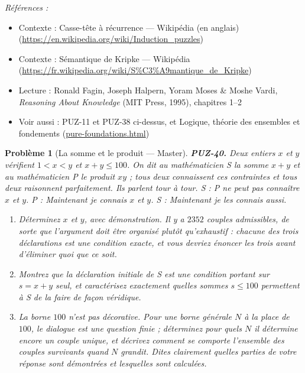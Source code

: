 \documentclass[11pt]{article}
\newtheorem{problem}{Problème}
\newenvironment{refs}{\par\small\noindent\emph{Références :}\begin{itemize}\setlength\itemsep{0pt}}{\end{itemize}\normalsize}
\begin{document}
\begin{refs}
\item Contexte : Casse-tête à récurrence --- Wikipédia (en anglais) (\url{https://en.wikipedia.org/wiki/Induction_puzzles})
\item Contexte : Sémantique de Kripke --- Wikipédia (\url{https://fr.wikipedia.org/wiki/S%C3%A9mantique_de_Kripke})
\item Lecture : Ronald Fagin, Joseph Halpern, Yoram Moses \& Moshe Vardi, \textit{Reasoning About Knowledge} (MIT Press, 1995), chapitres 1--2
\item Voir aussi : PUZ-11 et PUZ-38 ci-dessus, et Logique, théorie des ensembles et fondements (\url{pure-foundations.html})
\end{refs}

\bigskip

\begin{problem}[{La somme et le produit --- Master}]
\textbf{PUZ-40.} Deux entiers $ x $ et $ y $ vérifient $ 1 < x < y $ et
$ x + y \le 100 $. On dit au mathématicien S la somme $ x+y $ et au mathématicien P le
produit $ xy $ ; tous deux connaissent ces contraintes et tous deux raisonnent parfaitement.
Ils parlent tour à tour. S : \og{} P ne peut pas connaître $ x $ et $ y $. \fg{} P : \og{} Maintenant
je connais $ x $ et $ y $. \fg{} S : \og{} Maintenant je les connais aussi. \fg{}
\begin{enumerate}
\item[(a)] Déterminez $ x $ et $ y $, avec démonstration. Il y a $ 2352 $ couples
admissibles, de sorte que l'argument doit être organisé plutôt qu'exhaustif : chacune des
trois déclarations est une condition exacte, et vous devriez énoncer les trois avant
d'éliminer quoi que ce soit.
\item[(b)] Montrez que la déclaration initiale de S est une condition portant sur $ s = x+y $
seul, et caractérisez exactement quelles sommes $ s \le 100 $ permettent à S de la faire
de façon véridique.
\item[(c)] La borne $ 100 $ n'est pas décorative. Pour une borne générale $ N $ à la place de
$ 100 $, le dialogue est une question finie ; déterminez pour quels $ N $ il détermine
encore un couple unique, et décrivez comment se comporte l'ensemble des couples survivants
quand $ N $ grandit. Dites clairement quelles parties de votre réponse sont démontrées et
lesquelles sont calculées.
\end{enumerate}

\end{problem}
\end{document}
